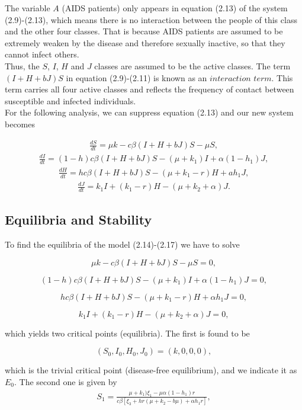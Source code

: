 The variable $A$ (AIDS patients) only appears in equation (2.13) of the system (2.9)-(2.13), which means there is no interaction between the people of this class and the other four classes. That is because AIDS patients are assumed to be extremely weaken by the disease and therefore sexually inactive, so that they cannot infect others.\\
Thus, the $S$, $I$, $H$ and $J$ classes are assumed to be the active classes. The term $(I+H+bJ)S$ in equation (2.9)-(2.11) is known as an $\textit{interaction term}$. This term carries all four active classes and reflects the frequency of contact between susceptible and infected individuals.\\
For the following analysis, we can suppress equation (2.13) and our new system becomes

\begin{align}
\frac{dS}{dt} = \mu k - c\beta(I+H+bJ)S - \mu S,
\end{align}
\begin{align}
\frac{dI}{dt} = (1-h)c\beta(I+H+bJ)S - (\mu+k_{1})I + \alpha(1-h_{1})J,
\end{align}
\begin{align}
\frac{dH}{dt} = hc\beta(I+H+bJ)S - (\mu+k_{1}-r)H + ah_{1}J,
\end{align}
\begin{align}
\frac{dJ}{dt} = k_{1}I + (k_{1}-r)H - (\mu+k_{2}+\alpha)J.
\end{align}

\subsection{Equilibria and Stability}
To find the equilibria of the model (2.14)-(2.17) we have to solve

$$
\mu k - c\beta(I+H+bJ)S - \mu S = 0,
$$

$$
(1-h)c\beta(I+H+bJ)S - (\mu+k_{1})I + \alpha(1-h_{1})J = 0,
$$

$$
hc\beta(I+H+bJ)S - (\mu+k_{1}-r)H + \alpha h_{1}J = 0,
$$

$$
k_{1}I + (k_{1}-r)H - (\mu+k_{2}+\alpha)J = 0,
$$

which yields two critical points (equilibria). The first is found to be 

$$
(S_{0},I_{0},H_{0},J_{0}) = (k,0,0,0),
$$

which is the trivial critical point (disease-free equilibrium), and we indicate it as $E_{0}$. The second one is given by
\clearpage
\begin{align}
S_{1} = \frac{\mu+k_{1})\xi_{1} - \mu\alpha(1-h_{1})r}{c\beta[\xi_{3}+hr(\mu+k_{2}-b\mu)+\alpha h_{1}r]},
\end{align}

